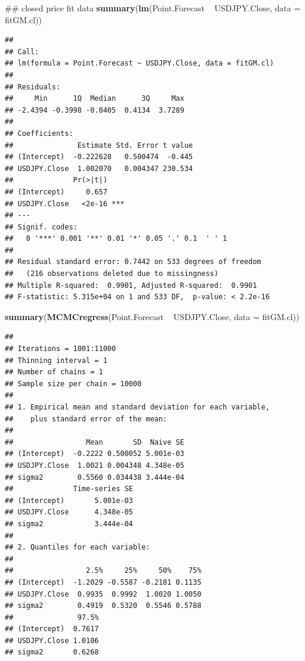 \documentclass[]{tufte-book}
\newenvironment{Shaded}{}{}
\newcommand{\KeywordTok}[1]{\textcolor[rgb]{0.00,0.44,0.13}{\textbf{#1}}}
\newcommand{\DataTypeTok}[1]{\textcolor[rgb]{0.56,0.13,0.00}{#1}}
\newcommand{\StringTok}[1]{\textcolor[rgb]{0.25,0.44,0.63}{#1}}
\newcommand{\OperatorTok}[1]{\textcolor[rgb]{0.40,0.40,0.40}{#1}}
\newcommand{\NormalTok}[1]{#1}
\begin{document}
\begin{Shaded}
\begin{Highlighting}[]
\NormalTok{## closed price fit data}
\KeywordTok{summary}\NormalTok{(}\KeywordTok{lm}\NormalTok{(Point.Forecast }\OperatorTok{~}\StringTok{ }\NormalTok{USDJPY.Close, }\DataTypeTok{data =}\NormalTok{ fitGM.cl))}
\end{Highlighting}
\end{Shaded}

\begin{verbatim}
## 
## Call:
## lm(formula = Point.Forecast ~ USDJPY.Close, data = fitGM.cl)
## 
## Residuals:
##     Min      1Q  Median      3Q     Max 
## -2.4394 -0.3998 -0.0405  0.4134  3.7289 
## 
## Coefficients:
##               Estimate Std. Error t value
## (Intercept)  -0.222628   0.500474  -0.445
## USDJPY.Close  1.002070   0.004347 230.534
##              Pr(>|t|)    
## (Intercept)     0.657    
## USDJPY.Close   <2e-16 ***
## ---
## Signif. codes:  
##   0 '***' 0.001 '**' 0.01 '*' 0.05 '.' 0.1  ' ' 1
## 
## Residual standard error: 0.7442 on 533 degrees of freedom
##   (216 observations deleted due to missingness)
## Multiple R-squared:  0.9901, Adjusted R-squared:  0.9901 
## F-statistic: 5.315e+04 on 1 and 533 DF,  p-value: < 2.2e-16
\end{verbatim}

\begin{Shaded}
\begin{Highlighting}[]
\KeywordTok{summary}\NormalTok{(}\KeywordTok{MCMCregress}\NormalTok{(Point.Forecast }\OperatorTok{~}\StringTok{ }\NormalTok{USDJPY.Close, }
    \DataTypeTok{data =}\NormalTok{ fitGM.cl))}
\end{Highlighting}
\end{Shaded}

\begin{verbatim}
## 
## Iterations = 1001:11000
## Thinning interval = 1 
## Number of chains = 1 
## Sample size per chain = 10000 
## 
## 1. Empirical mean and standard deviation for each variable,
##    plus standard error of the mean:
## 
##                 Mean       SD  Naive SE
## (Intercept)  -0.2222 0.500052 5.001e-03
## USDJPY.Close  1.0021 0.004348 4.348e-05
## sigma2        0.5560 0.034438 3.444e-04
##              Time-series SE
## (Intercept)       5.001e-03
## USDJPY.Close      4.348e-05
## sigma2            3.444e-04
## 
## 2. Quantiles for each variable:
## 
##                 2.5%     25%     50%    75%
## (Intercept)  -1.2029 -0.5587 -0.2181 0.1135
## USDJPY.Close  0.9935  0.9992  1.0020 1.0050
## sigma2        0.4919  0.5320  0.5546 0.5788
##               97.5%
## (Intercept)  0.7617
## USDJPY.Close 1.0106
## sigma2       0.6268
\end{verbatim}
\end{document}
